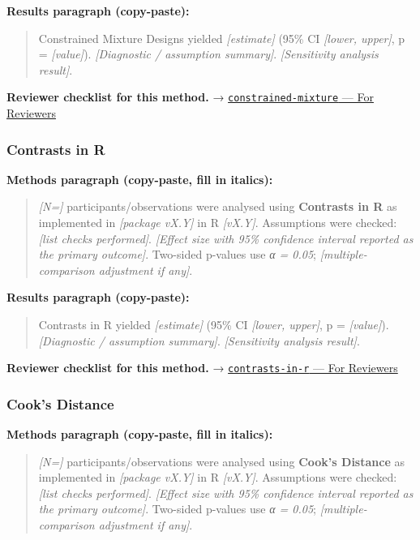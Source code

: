 \documentclass[
]{article}
\begin{document}
\textbf{Results paragraph (copy-paste):}

\begin{quote}
Constrained Mixture Designs yielded \emph{{[}estimate{]}} (95\% CI
\emph{{[}lower, upper{]}}, p = \emph{{[}value{]}}). \emph{{[}Diagnostic
/ assumption summary{]}}. \emph{{[}Sensitivity analysis result{]}}.
\end{quote}

\textbf{Reviewer checklist for this method.} →
\href{../chapters/16-design/constrained-mixture.Rmd\#for-reviewers}{\texttt{constrained-mixture}
--- For Reviewers}

\subsubsection{Contrasts in R}\label{contrasts-in-r}

\textbf{Methods paragraph (copy-paste, fill in italics):}

\begin{quote}
\emph{{[}N={]}} participants/observations were analysed using
\textbf{Contrasts in R} as implemented in \emph{{[}package vX.Y{]}} in R
\emph{{[}vX.Y{]}}. Assumptions were checked: \emph{{[}list checks
performed{]}}. \emph{{[}Effect size with 95\% confidence interval
reported as the primary outcome{]}}. Two-sided p-values use \emph{α =
0.05}; \emph{{[}multiple-comparison adjustment if any{]}}.
\end{quote}

\textbf{Results paragraph (copy-paste):}

\begin{quote}
Contrasts in R yielded \emph{{[}estimate{]}} (95\% CI \emph{{[}lower,
upper{]}}, p = \emph{{[}value{]}}). \emph{{[}Diagnostic / assumption
summary{]}}. \emph{{[}Sensitivity analysis result{]}}.
\end{quote}

\textbf{Reviewer checklist for this method.} →
\href{../chapters/07-regression/contrasts-in-r.Rmd\#for-reviewers}{\texttt{contrasts-in-r}
--- For Reviewers}

\subsubsection{Cook's Distance}\label{cooks-distance}

\textbf{Methods paragraph (copy-paste, fill in italics):}

\begin{quote}
\emph{{[}N={]}} participants/observations were analysed using
\textbf{Cook's Distance} as implemented in \emph{{[}package vX.Y{]}} in
R \emph{{[}vX.Y{]}}. Assumptions were checked: \emph{{[}list checks
performed{]}}. \emph{{[}Effect size with 95\% confidence interval
reported as the primary outcome{]}}. Two-sided p-values use \emph{α =
0.05}; \emph{{[}multiple-comparison adjustment if any{]}}.
\end{quote}
\end{document}
